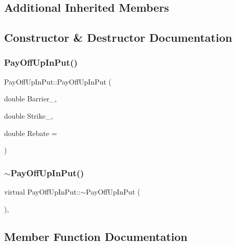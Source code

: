 \subsection*{Additional Inherited Members}


\subsection{Constructor \& Destructor Documentation}
\hypertarget{classPayOffUpInPut_a1f14c7bbf9924c6999f3fbc2ba849757}{}\label{classPayOffUpInPut_a1f14c7bbf9924c6999f3fbc2ba849757} 
\subsubsection{\texorpdfstring{Pay\+Off\+Up\+In\+Put()}{PayOffUpInPut()}}
{\footnotesize\ttfamily Pay\+Off\+Up\+In\+Put\+::\+Pay\+Off\+Up\+In\+Put (\begin{DoxyParamCaption}\item[{double}]{Barrier\+\_\+,  }\item[{double}]{Strike\+\_\+,  }\item[{double}]{Rebate = {} }\end{DoxyParamCaption})}

\hypertarget{classPayOffUpInPut_a38eb2ef3bf0f605bde25ad862d226264}{}\label{classPayOffUpInPut_a38eb2ef3bf0f605bde25ad862d226264} 
\subsubsection{\texorpdfstring{$\sim$\+Pay\+Off\+Up\+In\+Put()}{~PayOffUpInPut()}}
{\footnotesize\ttfamily virtual Pay\+Off\+Up\+In\+Put\+::$\sim$\+Pay\+Off\+Up\+In\+Put (\begin{DoxyParamCaption}{ }\end{DoxyParamCaption})\hspace{0.3cm}{\ttfamily [inline]}, {\ttfamily [virtual]}}



\subsection{Member Function Documentation}
\hypertarget{classPayOffUpInPut_ab56f32e37426f6662448aeaef9c8b4eb}{}\label{classPayOffUpInPut_ab56f32e37426f6662448aeaef9c8b4eb} 
